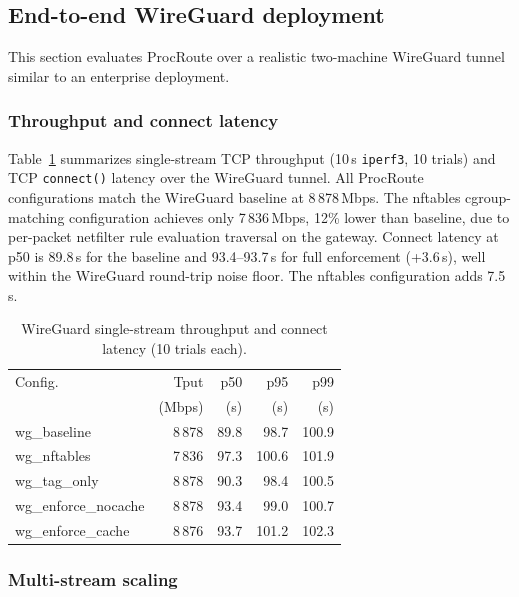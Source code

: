 \documentclass[sigconf]{acmart}
\begin{document}
\subsection{End-to-end WireGuard deployment}
\label{sec:eval:wireguard}

This section evaluates ProcRoute over a realistic two-machine
WireGuard tunnel similar to an enterprise deployment.

\subsubsection{Throughput and connect latency}
Table~\ref{tab:wg:throughput} summarizes single-stream TCP throughput
(10\,s \texttt{iperf3}, 10 trials) and TCP \texttt{connect()} latency
over the WireGuard tunnel.
All ProcRoute configurations match the WireGuard baseline at
8\,878\,Mbps.
The nftables cgroup-matching configuration achieves only
7\,836\,Mbps, 12\% lower than baseline, due to per-packet netfilter rule evaluation
traversal on the gateway.
Connect latency at p50 is 89.8\,\textmu{}s for the baseline and
93.4--93.7\,\textmu{}s for full enforcement
(+3.6\,\textmu{}s), well within the WireGuard round-trip noise
floor.  The nftables configuration adds 7.5\,\textmu{}s.

\begin{table}[t]
\centering
\caption{WireGuard single-stream throughput and connect latency
  (10 trials each).}
\label{tab:wg:throughput}
\small
\begin{tabular}{lrrrr}
\toprule
Config.\ & Tput & p50 & p95 & p99 \\
        & (Mbps) & (\textmu{}s) & (\textmu{}s) & (\textmu{}s) \\
\midrule
wg\_baseline          & 8\,878 & 89.8 & 98.7 & 100.9 \\
wg\_nftables          & 7\,836 & 97.3 & 100.6 & 101.9 \\
wg\_tag\_only         & 8\,878 & 90.3 & 98.4 & 100.5 \\
wg\_enforce\_nocache  & 8\,878 & 93.4 & 99.0 & 100.7 \\
wg\_enforce\_cache    & 8\,876 & 93.7 & 101.2 & 102.3 \\
\bottomrule
\end{tabular}
\end{table}

\subsubsection{Multi-stream scaling}
\end{document}
